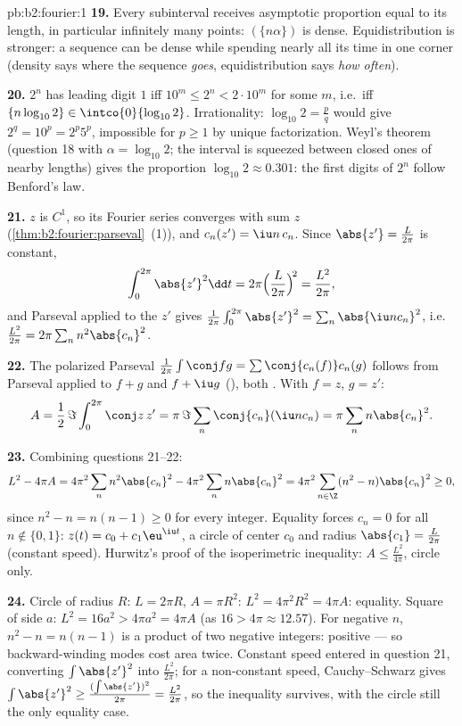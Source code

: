 \begin{solution}{pb:b2:fourier:1}
\textbf{19.} Every subinterval receives asymptotic proportion
equal to its length, in particular infinitely many points:
$(\{n\alpha\})$ is dense. Equidistribution is stronger: a
sequence can be dense while spending nearly all its time in one
corner (density says where the sequence \emph{goes},
equidistribution says \emph{how often}).

\textbf{20.} $2^n$ has leading digit $1$ iff $10^m \leq 2^n <
2\cdot10^m$ for some $m$, i.e.\ iff $\{n\log_{10}2\} \in
\intco{0}{\log_{10}2}$. Irrationality: $\log_{10}2 =
\frac pq$ would give $2^q = 10^p = 2^p5^p$, impossible for $p
\geq 1$ by unique factorization. Weyl's theorem (question 18
with $\alpha = \log_{10}2$; the  interval is squeezed
between closed ones of nearby lengths) gives the proportion
$\log_{10}2 \approx 0.301$: the first digits of $2^n$ follow
Benford's law.

\textbf{21.} $z$ is $C^1$, so its Fourier series converges
 with sum $z$ (\cref{thm:b2:fourier:parseval}~(1)),
and $c_n(z') = \iu n\,c_n$. Since $\abs{z'} = \frac{L}{2\pi}$
is constant,
\[
\int_0^{2\pi}\abs{z'}^2\dd t
= 2\pi\Bigl(\frac{L}{2\pi}\Bigr)^{\!2}
= \frac{L^2}{2\pi} ,
\]
and Parseval applied to the  $z'$ gives
$\frac{1}{2\pi}\int_0^{2\pi}\abs{z'}^2 =
\sum_n\abs{\iu nc_n}^2$, i.e.\ $\frac{L^2}{2\pi} = 2\pi\sum_n
n^2\abs{c_n}^2$.

\textbf{22.} The polarized Parseval $\frac{1}{2\pi}\int\conj
fg = \sum\conj{c_n(f)}c_n(g)$ follows from Parseval applied to
$f + g$ and $f + \iu g$ (), both
. With $f = z$, $g = z'$:
\[
A = \frac12\,\Im\int_0^{2\pi}\conj z\,z'
= \pi\,\Im\sum_n\conj{c_n}(\iu n c_n)
= \pi\sum_n n\abs{c_n}^2 .
\]

\textbf{23.} Combining questions 21--22:
\[
L^2 - 4\pi A
= 4\pi^2\sum_n n^2\abs{c_n}^2 -
4\pi^2\sum_n n\abs{c_n}^2
= 4\pi^2\sum_{n\in\Z}(n^2 - n)\abs{c_n}^2 \geq 0 ,
\]
since $n^2 - n = n(n-1) \geq 0$ for every integer. Equality
forces $c_n = 0$ for all $n \notin \{0, 1\}$: $z(t) = c_0 +
c_1\eu^{\iu t}$, a circle of center $c_0$ and radius
$\abs{c_1} = \frac{L}{2\pi}$ (constant speed). Hurwitz's proof
of the isoperimetric inequality: $A \leq \frac{L^2}{4\pi}$,
circle only.

\textbf{24.} Circle of radius $R$: $L = 2\pi R$, $A = \pi
R^2$: $L^2 = 4\pi^2R^2 = 4\pi A$: equality. Square of side
$a$: $L^2 = 16a^2 > 4\pi a^2 = 4\pi A$ (as $16 > 4\pi \approx
12.57$). For negative $n$, $n^2 - n = n(n - 1)$ is a product
of two negative integers: positive --- so backward-winding
modes cost area twice. Constant speed entered in question 21,
converting $\int\abs{z'}^2$ into $\frac{L^2}{2\pi}$; for a
non-constant speed, Cauchy--Schwarz gives $\int\abs{z'}^2 \geq
\frac{(\int\abs{z'})^2}{2\pi} = \frac{L^2}{2\pi}$, so the
inequality survives, with the circle still the only equality
case.


\end{solution}
